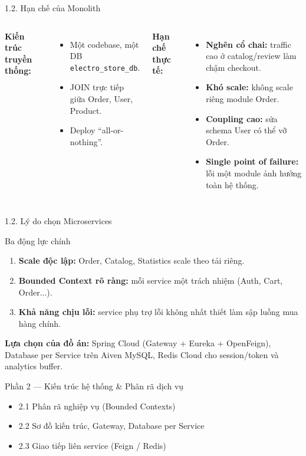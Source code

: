 \documentclass[aspectratio=169,12pt]{beamer}
\begin{document}
\begin{frame}{1.2. Hạn chế của Monolith}
  \begin{columns}[T]
    \textbf{Kiến trúc truyền thống:}
    \begin{itemize}
      \item Một codebase, một DB \texttt{electro\_store\_db}.
      \item JOIN trực tiếp giữa Order, User, Product.
      \item Deploy ``all-or-nothing''.
    \end{itemize}

    \textbf{Hạn chế thực tế:}
    \begin{itemize}
      \item \textbf{Nghẽn cổ chai:} traffic cao ở catalog/review làm chậm checkout.
      \item \textbf{Khó scale:} không scale riêng module Order.
      \item \textbf{Coupling cao:} sửa schema User có thể vỡ Order.
      \item \textbf{Single point of failure:} lỗi một module ảnh hưởng toàn hệ thống.
    \end{itemize}
  \end{columns}
\end{frame}

\begin{frame}{1.2. Lý do chọn Microservices}
  \begin{block}{Ba động lực chính}
    \begin{enumerate}
      \item \textbf{Scale độc lập:} Order, Catalog, Statistics scale theo tải riêng.
      \item \textbf{Bounded Context rõ ràng:} mỗi service một trách nhiệm (Auth, Cart, Order...).
      \item \textbf{Khả năng chịu lỗi:} service phụ trợ lỗi không nhất thiết làm sập luồng mua hàng chính.
    \end{enumerate}
  \end{block}

  \vspace{0.5em}
  \textbf{Lựa chọn của đồ án:} Spring Cloud (Gateway + Eureka + OpenFeign), Database per Service trên Aiven MySQL, Redis Cloud cho session/token và analytics buffer.
\end{frame}

\begin{frame}{Phần 2 — Kiến trúc hệ thống \& Phân rã dịch vụ}
  \begin{itemize}
    \item 2.1 Phân rã nghiệp vụ (Bounded Contexts)
    \item 2.2 Sơ đồ kiến trúc, Gateway, Database per Service
    \item 2.3 Giao tiếp liên service (Feign / Redis)
  \end{itemize}
\end{frame}
\end{document}
